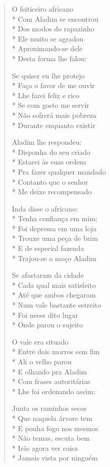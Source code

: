 \begin{verse}
O feiticeiro africano\\*
Com Aladim se encontrou\\*
Dos modos do rapazinho\\*
Ele muito se agradou\\*
Aproximando-se dele\\*
Desta forma lhe falou:

Se quiser eu lhe protejo\\*
Faça o favor de me ouvir\\*
Lhe farei feliz e rico\\*
Se com gosto me servir\\*
Não sofrerá mais pobreza\\*
Durante enquanto existir

Aladim lhe respondeu:\\*
Disponha do seu criado\\*
Estarei às suas ordens\\*
Pra fazer qualquer mandado\\*
Contanto que o senhor\\*
Me deixe recompensado

Inda disse o africano:\\*
Tenha confiança em mim;\\*
Foi depressa em uma loja\\*
Trouxe uma peça de brim\\*
E de especial fazenda\\*
Trajou-se o moço Aladim

Se afastaram da cidade\\*
Cada qual mais satisfeito\\*
Até que ambos chegaram\\*
Num vale bastante estreito\\*
Foi nesse dito lugar\\*
Onde parou o sujeito

O vale era situado\\*
Entre dois morros sem fim\\*
Ali o velho parou\\*
E olhando pra Aladim\\*
Com frases autoritárias\\*
Lhe foi ordenando assim:

Junta os raminhos secos\\*
Que naquela árvore tem\\*
E ponha fogo nos mesmos\\*
Não temas, escuta bem\\*
Irás agora ver coisa\\*
Jamais vista por ninguém


\end{verse}
